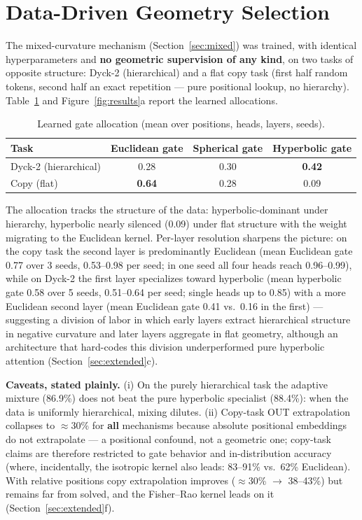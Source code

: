 \documentclass[11pt]{article}
\begin{document}
\section{Data-Driven Geometry Selection}\label{sec:gate}

The mixed-curvature mechanism (Section~\ref{sec:mixed}) was trained, with identical hyperparameters and \textbf{no geometric supervision of any kind}, on two tasks of opposite structure: Dyck-2 (hierarchical) and a flat copy task (first half random tokens, second half an exact repetition --- pure positional lookup, no hierarchy). Table~\ref{tab:gates} and Figure~\ref{fig:results}a report the learned allocations.

\begin{table}[h]
\centering\small
\begin{tabular}{lccc}
\toprule
Task & Euclidean gate & Spherical gate & Hyperbolic gate \\
\midrule
Dyck-2 (hierarchical) & 0.28 & 0.30 & \textbf{0.42} \\
Copy (flat) & \textbf{0.64} & 0.28 & 0.09 \\
\bottomrule
\end{tabular}
\caption{Learned gate allocation (mean over positions, heads, layers, seeds).}
\label{tab:gates}
\end{table}

The allocation tracks the structure of the data: hyperbolic-dominant under hierarchy, hyperbolic nearly silenced (0.09) under flat structure with the weight migrating to the Euclidean kernel. Per-layer resolution sharpens the picture: on the copy task the second layer is predominantly Euclidean (mean Euclidean gate 0.77 over 3 seeds, 0.53--0.98 per seed; in one seed all four heads reach 0.96--0.99), while on Dyck-2 the first layer specializes toward hyperbolic (mean hyperbolic gate 0.58 over 5 seeds, 0.51--0.64 per seed; single heads up to 0.85) with a more Euclidean second layer (mean Euclidean gate 0.41 vs.\ 0.16 in the first) --- suggesting a division of labor in which early layers extract hierarchical structure in negative curvature and later layers aggregate in flat geometry, although an architecture that hard-codes this division underperformed pure hyperbolic attention (Section~\ref{sec:extended}c).

\textbf{Caveats, stated plainly.} (i) On the purely hierarchical task the adaptive mixture (86.9\%) does not beat the pure hyperbolic specialist (88.4\%): when the data is uniformly hierarchical, mixing dilutes. (ii) Copy-task OUT extrapolation collapses to $\approx$30\% for \textbf{all} mechanisms because absolute positional embeddings do not extrapolate --- a positional confound, not a geometric one; copy-task claims are therefore restricted to gate behavior and in-distribution accuracy (where, incidentally, the isotropic kernel also leads: 83--91\% vs.\ 62\% Euclidean). With relative positions copy extrapolation improves ($\approx$30\% $\to$ 38--43\%) but remains far from solved, and the Fisher--Rao kernel leads on it (Section~\ref{sec:extended}f).
\end{document}
